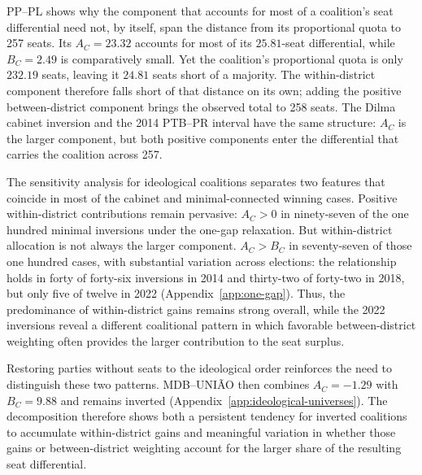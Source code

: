 \documentclass[11pt]{article}
\begin{document}
PP--PL shows why the component that accounts for most of a coalition's
seat differential need not, by itself, span the distance from its proportional
quota to 257 seats. Its \(A_C=23.32\) accounts for most of its
\(25.81\)-seat differential, while \(B_C=2.49\) is comparatively small.
Yet the coalition's proportional quota is only \(232.19\) seats, leaving
it \(24.81\) seats short of a majority. The within-district component
therefore falls short of that distance on its own; adding the positive
between-district component brings the observed total to 258 seats. The
Dilma cabinet inversion and the 2014 PTB--PR interval have the same
 structure: \(A_C\) is the larger component, but both positive
components enter the differential that carries the coalition across 257.

The sensitivity analysis for ideological coalitions separates two features that
coincide in most of the cabinet and minimal-connected winning cases. Positive
within-district contributions remain pervasive: \(A_C>0\) in ninety-seven of the
one hundred minimal inversions under the one-gap relaxation. But within-district
allocation is not always the larger component. \(A_C>B_C\) in seventy-seven of
those one hundred cases, with substantial variation across elections: the
relationship holds in forty of forty-six inversions in 2014 and thirty-two of
forty-two in 2018, but only five of twelve in 2022 (Appendix~\ref{app:one-gap}).
Thus, the predominance of within-district gains remains strong overall, while
the 2022 inversions reveal a different coalitional pattern in which favorable
between-district weighting often provides the larger contribution to the seat
surplus.

Restoring parties without seats to the ideological order reinforces the
need to distinguish these two patterns. MDB--UNIÃO then combines
\(A_C=-1.29\) with \(B_C=9.88\) and remains inverted
(Appendix~\ref{app:ideological-universes}). The decomposition therefore
shows both a persistent tendency for inverted coalitions to accumulate
within-district gains and meaningful variation in whether those gains or
between-district weighting account for the larger share of the resulting
seat differential.

\end{document}
